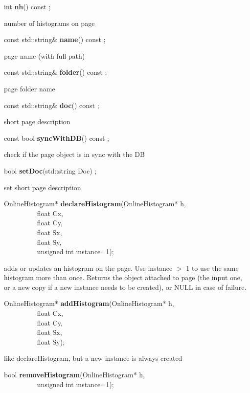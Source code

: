 \item    int {\bf nh}() const ;

 number of histograms on page


\item    const std::string\& {\bf name}() const ;

 page name (with full path)


\item    const std::string\& {\bf folder}() const ;

 page folder name


\item    const std::string\& {\bf doc}() const ;

 short page description


\item    const bool {\bf syncWithDB}() const ;

 check if the page object is in sync with the DB


\item    bool {\bf setDoc}(std::string Doc) ;

 set short page description


\item    OnlineHistogram* {\bf declareHistogram}(OnlineHistogram* h,\\\mbox{}~~~~~~~~~
				    float Cx,\\\mbox{}~~~~~~~~~
				    float Cy,\\\mbox{}~~~~~~~~~
				    float Sx,\\\mbox{}~~~~~~~~~
				    float Sy,\\\mbox{}~~~~~~~~~
				    unsigned int instance=1);

 adds or updates an histogram on the page. Use instance $>$ 1 to use the
 same histogram more than once. Returns the object attached to page (the input
 one, or a new copy if a new instance needs to be created), or NULL in case of failure. 


\item    OnlineHistogram* {\bf addHistogram}(OnlineHistogram* h,\\\mbox{}~~~~~~~~~
				float Cx,\\\mbox{}~~~~~~~~~
				float Cy,\\\mbox{}~~~~~~~~~
				float Sx,\\\mbox{}~~~~~~~~~
				float Sy);

 like declareHistogram, but a new instance is always created


\item    bool {\bf removeHistogram}(OnlineHistogram* h,\\\mbox{}~~~~~~~~~
		       unsigned int instance=1);

